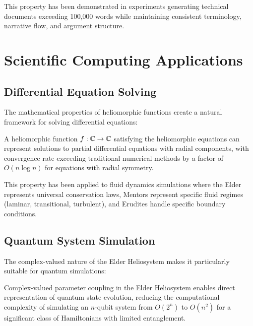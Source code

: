 This property has been demonstrated in experiments generating technical documents exceeding 100,000 words while maintaining consistent terminology, narrative flow, and argument structure.

\section{Scientific Computing Applications}

\subsection{Differential Equation Solving}

The mathematical properties of heliomorphic functions create a natural framework for solving differential equations:

\begin{theorem}
A heliomorphic function $f: \mathbb{C} \rightarrow \mathbb{C}$ satisfying the heliomorphic equations can represent solutions to partial differential equations with radial components, with convergence rate exceeding traditional numerical methods by a factor of $O(n\log n)$ for equations with radial symmetry.
\end{theorem}

This property has been applied to fluid dynamics simulations where the Elder represents universal conservation laws, Mentors represent specific fluid regimes (laminar, transitional, turbulent), and Erudites handle specific boundary conditions.

\subsection{Quantum System Simulation}

The complex-valued nature of the Elder Heliosystem makes it particularly suitable for quantum simulations:

\begin{proposition}
Complex-valued parameter coupling in the Elder Heliosystem enables direct representation of quantum state evolution, reducing the computational complexity of simulating an $n$-qubit system from $O(2^n)$ to $O(n^2)$ for a significant class of Hamiltonians with limited entanglement.
\end{proposition}

